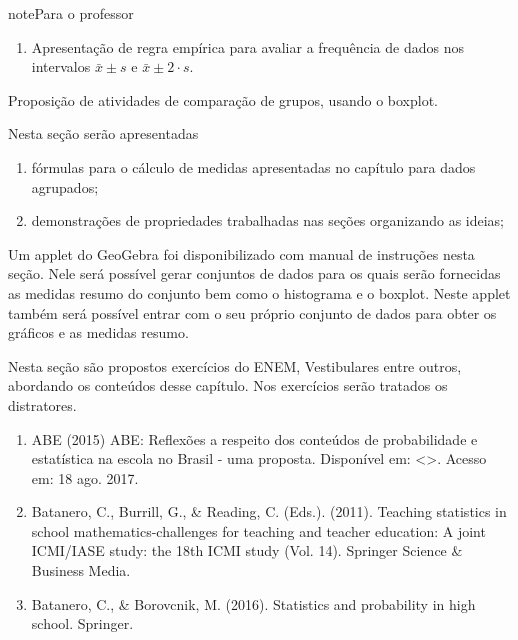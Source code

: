 \begin{sphinxadmonition}{note}{Para o professor}
\begin{enumerate}
\item {} 
Apresentação de regra empírica para avaliar a frequência de dados nos intervalos \(\bar{x}\pm s\) e \(\bar{x}\pm 2\cdot s\).

\end{enumerate}

  Proposição de atividades de comparação de grupos, usando o boxplot.


Nesta seção serão apresentadas
\begin{enumerate}
\item {} 
fórmulas para o cálculo de medidas apresentadas no capítulo para dados agrupados;

\item {} 
demonstrações de propriedades trabalhadas nas seções organizando as ideias;

\end{enumerate}


Um applet do GeoGebra foi disponibilizado com manual de instruções nesta seção. Nele será possível gerar conjuntos de dados para os quais serão fornecidas as medidas resumo do conjunto bem como o histograma e o boxplot. Neste applet também será possível entrar com o seu próprio conjunto de dados para obter os gráficos e as medidas resumo.


Nesta seção são propostos exercícios do ENEM, Vestibulares entre outros, abordando os conteúdos desse capítulo. Nos exercícios serão tratados os distratores.

\begin{enumerate}
\item {} 
ABE (2015) ABE: Reflexões a respeito dos conteúdos de probabilidade e estatística na escola no Brasil - uma proposta. Disponível em: \textless{}\textgreater{}. Acesso em: 18 ago. 2017.

\item {} 
Batanero, C., Burrill, G., \& Reading, C. (Eds.). (2011). Teaching statistics in school mathematics-challenges for teaching and teacher education: A joint ICMI/IASE study: the 18th ICMI study (Vol. 14). Springer Science \& Business Media.

\item {} 
Batanero, C., \& Borovcnik, M. (2016). Statistics and probability in high school. Springer.


\end{enumerate}
\end{sphinxadmonition}
